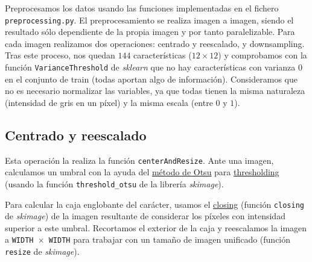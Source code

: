 \documentclass[a4]{article}
\begin{document}
Preprocesamos los datos usando las funciones implementadas en el
fichero \texttt{preprocessing.py}. El preprocesamiento se realiza
imagen a imagen, siendo el resultado sólo dependiente de la propia
imagen y por tanto paralelizable. Para cada imagen realizamos dos operaciones: centrado y reescalado, y downsampling. Tras este proceso, nos quedan $144$ características ($12 \times 12$) y comprobamos con la función \texttt{VarianceThreshold} de \textit{sklearn} que no hay características con varianza $0$ en el conjunto de train (todas aportan algo de información). Consideramos que no es necesario normalizar las variables, ya que todas tienen la misma naturaleza (intensidad de gris en un píxel) y la misma escala (entre $0$ y $1$).

\subsection{Centrado y reescalado}

Esta operación la realiza la función \texttt{centerAndResize}. Ante
una imagen, calculamos un umbral con la ayuda del \href{https://en.wikipedia.org/wiki/Otsu%27s_method}{método de Otsu}
  para
\href{https://en.wikipedia.org/wiki/Thresholding_(image_processing)}{thresholding} (usando la función \texttt{threshold\_otsu} de la librería \textit{skimage}). 

Para calcular la caja englobante del carácter, usamos el
\href{https://en.wikipedia.org/wiki/Closing_%28morphology%29}{closing}
  (función \texttt{closing} de \textit{skimage}) de la imagen
  resultante de considerar los píxeles con intensidad superior a este
  umbral. Recortamos el exterior de la caja y reescalamos la imagen a
  \texttt{WIDTH $\times$ WIDTH} para trabajar con un tamaño de imagen
  unificado (función \texttt{resize} de \textit{skimage}).

\end{document}
